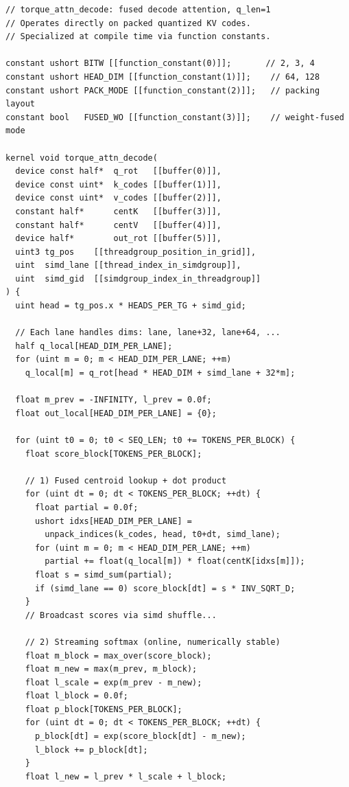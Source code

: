 \documentclass[nobib]{tufte-handout}
\begin{document}
\begin{fullwidth}
\begin{lstlisting}
// torque_attn_decode: fused decode attention, q_len=1
// Operates directly on packed quantized KV codes.
// Specialized at compile time via function constants.

constant ushort BITW [[function_constant(0)]];       // 2, 3, 4
constant ushort HEAD_DIM [[function_constant(1)]];    // 64, 128
constant ushort PACK_MODE [[function_constant(2)]];   // packing layout
constant bool   FUSED_WO [[function_constant(3)]];    // weight-fused mode

kernel void torque_attn_decode(
  device const half*  q_rot   [[buffer(0)]],
  device const uint*  k_codes [[buffer(1)]],
  device const uint*  v_codes [[buffer(2)]],
  constant half*      centK   [[buffer(3)]],
  constant half*      centV   [[buffer(4)]],
  device half*        out_rot [[buffer(5)]],
  uint3 tg_pos    [[threadgroup_position_in_grid]],
  uint  simd_lane [[thread_index_in_simdgroup]],
  uint  simd_gid  [[simdgroup_index_in_threadgroup]]
) {
  uint head = tg_pos.x * HEADS_PER_TG + simd_gid;

  // Each lane handles dims: lane, lane+32, lane+64, ...
  half q_local[HEAD_DIM_PER_LANE];
  for (uint m = 0; m < HEAD_DIM_PER_LANE; ++m)
    q_local[m] = q_rot[head * HEAD_DIM + simd_lane + 32*m];

  float m_prev = -INFINITY, l_prev = 0.0f;
  float out_local[HEAD_DIM_PER_LANE] = {0};

  for (uint t0 = 0; t0 < SEQ_LEN; t0 += TOKENS_PER_BLOCK) {
    float score_block[TOKENS_PER_BLOCK];

    // 1) Fused centroid lookup + dot product
    for (uint dt = 0; dt < TOKENS_PER_BLOCK; ++dt) {
      float partial = 0.0f;
      ushort idxs[HEAD_DIM_PER_LANE] =
        unpack_indices(k_codes, head, t0+dt, simd_lane);
      for (uint m = 0; m < HEAD_DIM_PER_LANE; ++m)
        partial += float(q_local[m]) * float(centK[idxs[m]]);
      float s = simd_sum(partial);
      if (simd_lane == 0) score_block[dt] = s * INV_SQRT_D;
    }
    // Broadcast scores via simd shuffle...

    // 2) Streaming softmax (online, numerically stable)
    float m_block = max_over(score_block);
    float m_new = max(m_prev, m_block);
    float l_scale = exp(m_prev - m_new);
    float l_block = 0.0f;
    float p_block[TOKENS_PER_BLOCK];
    for (uint dt = 0; dt < TOKENS_PER_BLOCK; ++dt) {
      p_block[dt] = exp(score_block[dt] - m_new);
      l_block += p_block[dt];
    }
    float l_new = l_prev * l_scale + l_block;


\end{lstlisting}
\end{fullwidth}
\end{document}

